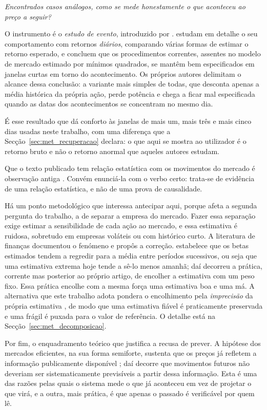 \emph{Encontrados casos análogos, como se mede honestamente o que aconteceu ao preço a seguir?}

O instrumento é o \emph{estudo de evento}, introduzido por \textcite{fama1969adjustment}.
\textcite{brown1985daily} estudam em detalhe o seu comportamento com retornos \emph{diários},
comparando várias formas de estimar o retorno esperado, e concluem que os procedimentos correntes,
assentes no modelo de mercado estimado por mínimos quadrados, se mantêm bem especificados em janelas
curtas em torno do acontecimento. Os próprios autores delimitam o alcance dessa conclusão: a variante
mais simples de todas, que desconta apenas a média histórica da própria ação, perde potência e
chega a ficar mal especificada quando as datas dos acontecimentos se concentram no mesmo dia.

É esse resultado que dá conforto às janelas de mais um, mais três e mais cinco dias usadas neste
trabalho, com uma diferença que a Secção~\ref{sec:met_recuperacao} declara: o que aqui se mostra ao
utilizador é o retorno bruto e não o retorno anormal que aqueles autores estudam.

Que o texto publicado tem relação estatística com os movimentos do mercado é observação antiga
\autocite{tetlock2007media}. Convém enunciá-la com o verbo certo: trata-se de evidência de uma
relação estatística, e não de uma prova de causalidade.

Há um ponto metodológico que interessa antecipar aqui, porque afeta a segunda pergunta do trabalho,
a de separar a empresa do mercado. Fazer essa separação exige estimar a sensibilidade de cada ação
ao mercado, e essa estimativa é ruidosa, sobretudo em empresas voláteis ou com histórico curto. A
literatura de finanças documentou o fenómeno e propôs a correção. \textcite{blume1971risk} estabelece
que os betas estimados tendem a regredir para a média entre períodos sucessivos, ou seja que uma
estimativa extrema hoje tende a sê-lo menos amanhã; daí decorreu a prática, corrente mas posterior ao
próprio artigo, de encolher a estimativa com um peso fixo. Essa prática encolhe com a mesma força uma
estimativa boa e uma má. A alternativa que este trabalho adota pondera o encolhimento pela
\emph{imprecisão} da própria estimativa \autocite{vasicek1973beta}, de modo que uma estimativa fiável
é praticamente preservada e uma frágil é puxada para o valor de referência. O detalhe está na
Secção~\ref{sec:met_decomposicao}.

Por fim, o enquadramento teórico que justifica a recusa de prever. A hipótese dos mercados
eficientes, na sua forma semiforte, sustenta que os preços já refletem a informação publicamente
disponível \autocite{fama1970efficient}; daí decorre que movimentos futuros não deveriam ser
sistematicamente previsíveis a partir dessa informação. Esta é uma das razões pelas quais o sistema mede o que já
aconteceu em vez de projetar o que virá, e a outra, mais prática, é que apenas o passado é
verificável por quem lê.

